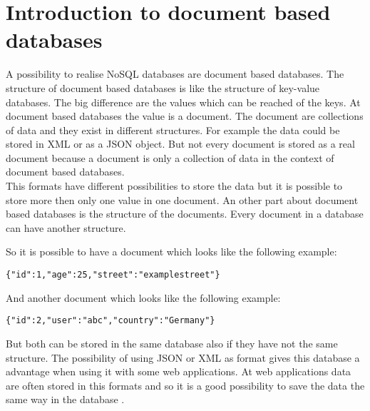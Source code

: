 \section{Introduction to document based databases}
A possibility to realise NoSQL databases are document based databases. The structure of document based databases is like the structure of key-value databases. The big difference are the values which can be reached of the keys. At document based databases the value is a document. The document are collections of data and they exist in different structures. For example the data could be stored in XML or as a JSON object. But not every document is stored as a real document because a document is only a collection of data in the context of document based databases. \\
This formats have different possibilities to store the data but it is possible to store more then only one value in one document. An other part about document based databases is the structure of the documents. Every document in a database can have another structure. 

So it is possible to have a document which looks like the following example:
\begin{lstlisting}[frame=single, caption=Example]
{"id":1,"age":25,"street":"examplestreet"}
\end{lstlisting}
And another document which looks like the following example: 
\begin{lstlisting}[Example of an other document]
{"id":2,"user":"abc","country":"Germany"}
\end{lstlisting}

%
But both can be stored in the same database also if they have not the same structure. 
The possibility of using JSON or XML as format gives this database a advantage when using it with some web applications. At web applications data are often stored in this formats and so it is a good possibility to save the data the same way in the database \cite{DocDBIntro1,DocDBIntro2,DocDBIntro3}.
